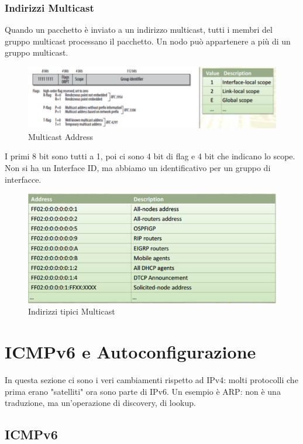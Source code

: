 \documentclass{article}
\begin{document}
\subsubsection{Indirizzi Multicast}
Quando un pacchetto è inviato a un indirizzo multicast, tutti i membri del gruppo multicast processano il pacchetto. Un nodo può appartenere a più di un gruppo multicast.

\begin{figure}[H]
\centering
\includegraphics[scale=0.5]{figures/multicast address.png}
\caption{Multicast Address}
\end{figure}

I primi 8 bit sono tutti a 1, poi ci sono 4 bit di flag e 4 bit che indicano lo scope. Non si ha un Interface ID, ma abbiamo un identificativo per un gruppo di interfacce.

\begin{figure}[H]
\centering
\includegraphics[scale=0.4]{figures/indirizzi tipici multicast.png}
\caption{Indirizzi tipici Multicast}
\end{figure}

\newpage
\section{ICMPv6 e Autoconfigurazione}
In questa sezione ci sono i veri cambiamenti rispetto ad IPv4: molti protocolli che prima erano "satelliti" ora sono parte di IPv6. Un esempio è ARP: non è una traduzione, ma un'operazione di discovery, di lookup. 

\subsection{ICMPv6} 
\end{document}
